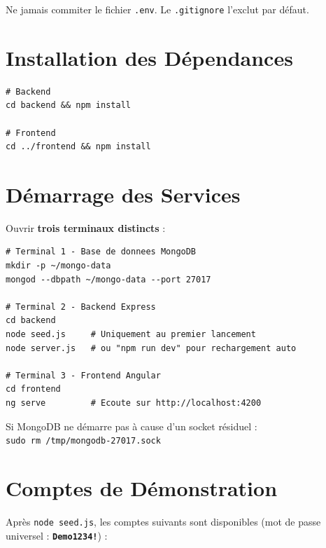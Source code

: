 \documentclass[12pt,a4paper]{report}
\begin{document}
\begin{warnbox}[title=Important]
  Ne jamais commiter le fichier \texttt{.env}. Le \texttt{.gitignore} l'exclut par défaut.
\end{warnbox}

\section{Installation des Dépendances}

\begin{lstlisting}[style=bash]
# Backend
cd backend && npm install

# Frontend
cd ../frontend && npm install
\end{lstlisting}

\section{Démarrage des Services}

Ouvrir \textbf{trois terminaux distincts} :

\begin{lstlisting}[style=bash]
# Terminal 1 - Base de donnees MongoDB
mkdir -p ~/mongo-data
mongod --dbpath ~/mongo-data --port 27017

# Terminal 2 - Backend Express
cd backend
node seed.js     # Uniquement au premier lancement
node server.js   # ou "npm run dev" pour rechargement auto

# Terminal 3 - Frontend Angular
cd frontend
ng serve         # Ecoute sur http://localhost:4200
\end{lstlisting}

\begin{infobox}[title=Socket MongoDB bloqué]
  Si MongoDB ne démarre pas à cause d'un socket résiduel :\\
  \texttt{sudo rm /tmp/mongodb-27017.sock}
\end{infobox}

\section{Comptes de Démonstration}

Après \texttt{node seed.js}, les comptes suivants sont disponibles (mot de passe universel : \textbf{\texttt{Demo1234!}}) :
\end{document}
